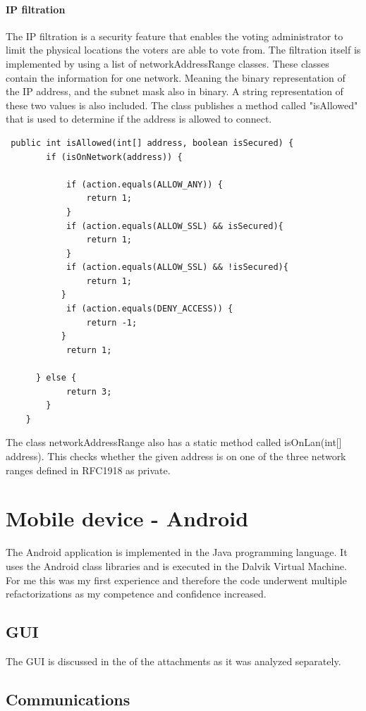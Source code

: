 \documentclass[11pt,twoside,a4paper]{book}
\begin{document}
\paragraph{IP filtration}
The IP filtration is a security feature that enables the voting administrator to limit the physical locations the voters are able to vote from. The filtration itself is implemented by using a list of networkAddressRange classes. These classes contain the information for one network. Meaning the binary representation of the IP address, and the subnet mask also in binary. A string representation of these two values is also included. The class publishes a method called "isAllowed" that is used to determine if the address is allowed to connect.

\begin{lstlisting}
 public int isAllowed(int[] address, boolean isSecured) {
        if (isOnNetwork(address)) {

            if (action.equals(ALLOW_ANY)) {
                return 1;
            }
            if (action.equals(ALLOW_SSL) && isSecured){
                return 1;
            }
            if (action.equals(ALLOW_SSL) && !isSecured){
                return 1;
           }
            if (action.equals(DENY_ACCESS)) {
                return -1;
           }
            return 1;

      } else {
            return 3;
        }
    }
\end{lstlisting}
The class networkAddressRange also has a static method called isOnLan(int[] address). This checks whether the given address is on one of the three network ranges defined in RFC1918 as private.

\section{Mobile device - Android}
The Android application is implemented in the Java programming language. It uses the Android class libraries and is executed in the Dalvik Virtual Machine. For me this was my first experience and therefore the code underwent multiple refactorizations as my competence and confidence increased.
\subsection{GUI} 
The GUI is discussed in the of the attachments as it was analyzed separately.
\subsection{Communications}
\end{document}

